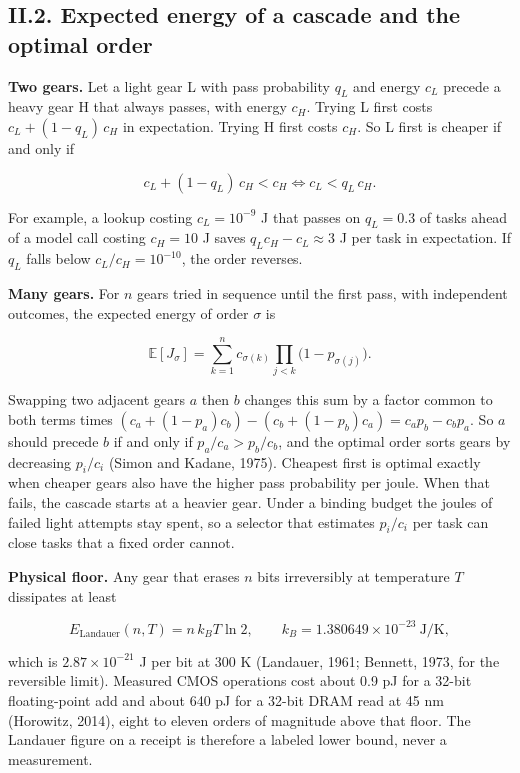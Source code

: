 \documentclass[
  10pt,
]{article}
\begin{document}
\subsection{II.2. Expected energy of a cascade and the optimal
order}\label{ii.2.-expected-energy-of-a-cascade-and-the-optimal-order}

\textbf{Two gears.} Let a light gear L with pass probability \(q_L\) and
energy \(c_L\) precede a heavy gear H that always passes, with energy
\(c_H\). Trying L first costs \(c_L + (1 - q_L)\,c_H\) in expectation.
Trying H first costs \(c_H\). So L first is cheaper if and only if

\[c_L + (1 - q_L)\,c_H < c_H \iff c_L < q_L\, c_H .\]

For example, a lookup costing \(c_L = 10^{-9}\) J that passes on
\(q_L = 0.3\) of tasks ahead of a model call costing \(c_H = 10\) J
saves \(q_L c_H - c_L \approx 3\) J per task in expectation. If \(q_L\)
falls below \(c_L / c_H = 10^{-10}\), the order reverses.

\textbf{Many gears.} For \(n\) gears tried in sequence until the first
pass, with independent outcomes, the expected energy of order \(\sigma\)
is

\[\mathbb{E}[J_\sigma] = \sum_{k=1}^{n} c_{\sigma(k)} \prod_{j<k} \bigl(1 - p_{\sigma(j)}\bigr).\]

Swapping two adjacent gears \(a\) then \(b\) changes this sum by a
factor common to both terms times
\((c_a + (1-p_a)c_b) - (c_b + (1-p_b)c_a) = c_a p_b - c_b p_a\). So
\(a\) should precede \(b\) if and only if \(p_a / c_a > p_b / c_b\), and
the optimal order sorts gears by decreasing \(p_i / c_i\) (Simon and
Kadane, 1975). Cheapest first is optimal exactly when cheaper gears also
have the higher pass probability per joule. When that fails, the cascade
starts at a heavier gear. Under a binding budget the joules of failed
light attempts stay spent, so a selector that estimates \(p_i / c_i\)
per task can close tasks that a fixed order cannot.

\textbf{Physical floor.} Any gear that erases \(n\) bits irreversibly at
temperature \(T\) dissipates at least

\[E_{\text{Landauer}}(n, T) = n\, k_B T \ln 2, \qquad k_B = 1.380649 \times 10^{-23}\ \text{J/K},\]

which is \(2.87 \times 10^{-21}\) J per bit at 300 K (Landauer, 1961;
Bennett, 1973, for the reversible limit). Measured CMOS operations cost
about 0.9 pJ for a 32-bit floating-point add and about 640 pJ for a
32-bit DRAM read at 45 nm (Horowitz, 2014), eight to eleven orders of
magnitude above that floor. The Landauer figure on a receipt is
therefore a labeled lower bound, never a measurement.
\end{document}
